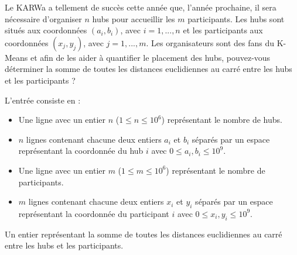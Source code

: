 \problemname{\problemyamlname}


\newcommand{\maxa}{123456789}

Le KARWa a tellement de succès cette année que, l'année prochaine, il sera nécessaire d'organiser $n$ hubs pour
accueillir les $m$ participants. Les hubs sont situés aux coordonnées $(a_i , b_i )$, avec $i = 1, ..., n$ et les participants aux coordonnées $(x_j , y_j )$, avec $j = 1, ..., m$.
Les organisateurs sont des fans du K-Means et afin de les aider à quantifier le placement des hubs, pouvez-vous
déterminer la somme de toutes les distances euclidiennes au carré entre les hubs et les participants ?
\begin{Input}
    L'entrée consiste en :
    \begin{itemize}
        \item Une ligne avec un entier \(n\) (\(1 \leq n \leq 10^{6}\)) représentant le nombre de hubs.
      \item \(n\) lignes contenant chacune deux entiers \(a_{i}\) et \(b_{i}\) séparés par un espace représentant la coordonnée du hub \(i\) avec \(0 \leq a_i, b_i\leq 10^{9}\).
        \item Une ligne avec un entier \(m\) (\(1 \leq m \leq 10^{6}\))  représentant le nombre de participants.
      \item \(m\) lignes contenant chacune deux entiers \(x_{i}\) et \(y_{i}\) séparés par un espace représentant la coordonnée du participant \(i\) avec \(0 \leq x_i, y_i\leq 10^{9}\).
    \end{itemize}
\end{Input}

\begin{Output}
Un entier représentant la somme de toutes les distances euclidiennes au carré entre les hubs et les participants.
\end{Output}
